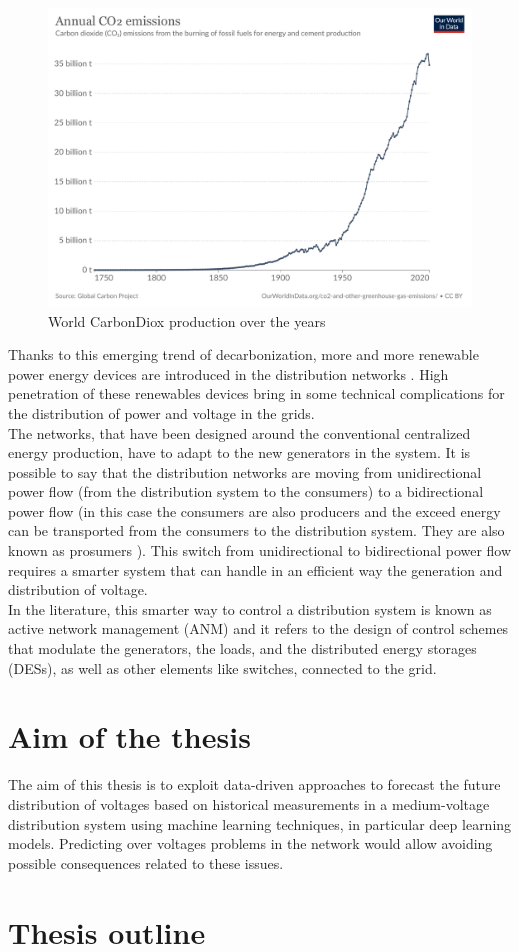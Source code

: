 \begin{figure}[H]
\centering
    \includegraphics[width=.6\linewidth]{images/Introduction/annual-co2-emissions-per-country.pdf}
\caption[\gls{CarbonDiox} production over the years]{World \gls{CarbonDiox} production over the years \cite{C02prod}}
\end{figure}

Thanks to this emerging trend of decarbonization, more and more renewable power energy devices are introduced in the distribution networks \cite{owidenergy}. High penetration of these renewables devices bring in some technical complications for the distribution of power and voltage in the grids. \\
The networks, that have been designed around the conventional centralized energy production, have to adapt to the new generators in the system. It is possible to say that the distribution networks are moving from unidirectional power flow (from the distribution system to the consumers) to a bidirectional power flow (in this case the consumers are also producers and the exceed energy can be transported from the consumers to the distribution system. They are also known as prosumers \cite{prosumers}). This switch from unidirectional to bidirectional power flow requires a smarter system that can handle in an efficient way the generation and distribution of voltage.\\

In the literature, this smarter way to control a distribution system is known as active network management (\gls{ANM}) and it refers to the design of control schemes that modulate the generators, the loads, and the distributed energy storages (\glspl{DES}), as well as other elements like switches, connected to the grid. \\


\section{Aim of the thesis}
\label{sec:aimthesis}
The aim of this thesis is to exploit data-driven approaches to forecast the future distribution of voltages based on historical measurements in a medium-voltage distribution system using machine learning techniques, in particular deep learning models. Predicting over voltages problems in the network would allow avoiding possible consequences related to these issues. 


\section{Thesis outline}

